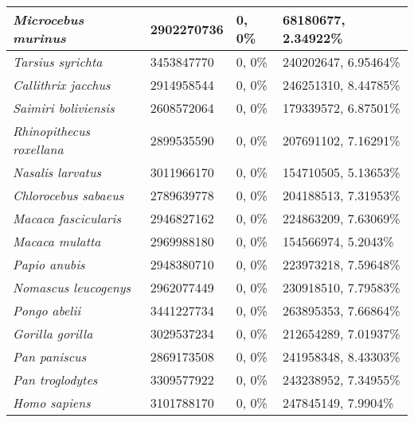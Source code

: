 {\begin{longtable}{| L{4cm} | L{2.7cm}  | L{3.7cm} | L{3.7cm} |}
\textit{Microcebus murinus} & 2902270736 & 0, 0\% & 68180677, 2.34922\% \\ \hline
\textit{Tarsius syrichta} & 3453847770 & 0, 0\% & 240202647, 6.95464\% \\ \hline
\textit{Callithrix jacchus} & 2914958544 & 0, 0\% & 246251310, 8.44785\% \\ \hline
\textit{Saimiri boliviensis} & 2608572064 & 0, 0\% & 179339572, 6.87501\% \\ \hline
\textit{Rhinopithecus roxellana} & 2899535590 & 0, 0\% & 207691102, 7.16291\% \\ \hline
\textit{Nasalis larvatus} & 3011966170 & 0, 0\% & 154710505, 5.13653\% \\ \hline
\textit{Chlorocebus sabaeus} & 2789639778 & 0, 0\% & 204188513, 7.31953\% \\ \hline
\textit{Macaca fascicularis} & 2946827162 & 0, 0\% & 224863209, 7.63069\% \\ \hline
\textit{Macaca mulatta} & 2969988180 & 0, 0\% & 154566974, 5.2043\% \\ \hline
\textit{Papio anubis} & 2948380710 & 0, 0\% & 223973218, 7.59648\% \\ \hline
\textit{Nomascus leucogenys} & 2962077449 & 0, 0\% & 230918510, 7.79583\% \\ \hline
\textit{Pongo abelii} & 3441227734 & 0, 0\% & 263895353, 7.66864\% \\ \hline
\textit{Gorilla gorilla} & 3029537234 & 0, 0\% & 212654289, 7.01937\% \\ \hline
\textit{Pan paniscus} & 2869173508 & 0, 0\% & 241958348, 8.43303\% \\ \hline
\textit{Pan troglodytes} & 3309577922 & 0, 0\% & 243238952, 7.34955\% \\ \hline
\textit{Homo sapiens} & 3101788170 & 0, 0\% & 247845149, 7.9904\% \\ \hline


\end{longtable}}
